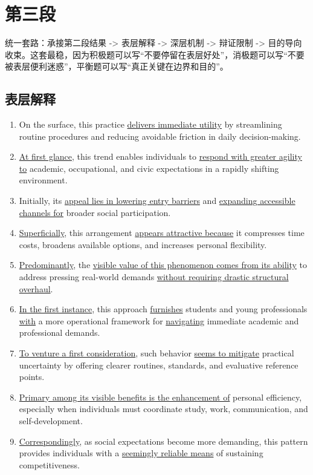 \section{第三段}
统一套路：承接第二段结果 -> 表层解释 -> 深层机制 -> 辩证限制 -> 目的导向收束。这套最稳，因为积极题可以写“不要停留在表层好处”，消极题可以写“不要被表层便利迷惑”，平衡题可以写“真正关键在边界和目的”。

\subsection{表层解释}

\begin{enumerate}
    \item On the surface, this practice \underline{delivers immediate utility} by streamlining routine procedures and reducing avoidable friction in daily decision-making.
    \item \underline{At first glance}, this trend enables individuals to \underline{respond with greater agility to} academic, occupational, and civic expectations in a rapidly shifting environment.
    \item Initially, its \underline{appeal lies in lowering entry barriers} and \underline{expanding accessible channels for} broader social participation.
    \item \underline{Superficially}, this arrangement \underline{appears attractive because} it compresses time costs, broadens available options, and increases personal flexibility.
    \item \underline{Predominantly}, the \underline{visible value of this phenomenon comes from its ability} to address pressing real-world demands \underline{without requiring drastic structural overhaul}.
    \item \underline{In the first instance}, this approach \underline{furnishes} students and young professionals \underline{with} a more operational framework for \underline{navigating} immediate academic and professional demands.
    \item \underline{To venture a first consideration}, such behavior \underline{seems to mitigate} practical uncertainty by offering clearer routines, standards, and evaluative reference points.
    \item \underline{Primary among its visible benefits is the enhancement of} personal efficiency, especially when individuals must coordinate study, work, communication, and self-development.
    \item \underline{Correspondingly}, as social expectations become more demanding, this pattern provides individuals with a \underline{seemingly reliable means} of sustaining competitiveness.

\end{enumerate}
